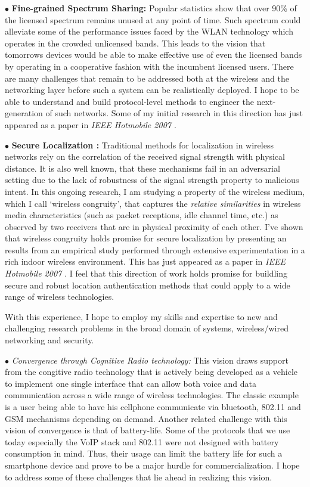 \documentclass[11pt,letterpaper]{article}
\begin{document}
$\bullet$ {\bf Fine-grained Spectrum Sharing:} Popular statistics show that over 90\% of the licensed spectrum remains
unused at any point of time.  Such spectrum could alleviate some of the performance issues faced by the WLAN technology
which operates in the crowded unlicensed bands. This leads to the vision that tomorrows devices would be able to make
effective use of even the licensed bands by operating in a cooperative fashion with the incumbent licensed users. There
are many challenges that remain to be addressed both at the wireless and the networking layer before such a system can
be realistically deployed. I hope to be able to understand and build protocol-level methods to engineer the
next-generation of such networks. Some of my initial research in this direction has just appeared as a paper in {\it
IEEE Hotmobile 2007 \cite{spark2007}}.

$\bullet$ {\bf Secure Localization :} Traditional methods for localization in wireless networks rely on the correlation of the received signal strength with
physical distance. It is also well known, that these mechanisms fail in an adversarial setting due to the lack of
robustness of the signal strength property to malicious intent. In this ongoing research, I am studying a property of the wireless
medium, which I call `wireless congruity', that captures the {\it relative similarities} in wireless media
characteristics (such as packet receptions, idle channel time, etc.) as observed by two receivers that are in physical
proximity of each other. I've shown that wireless congruity holds promise for secure localization by presenting an
results from an empirical study performed through extensive experimentation in a rich indoor wireless environment.
This has just appeared as a paper in {\it IEEE Hotmobile 2007 \cite{cong2007}}. I feel that this direction of work holds promise for
buildling secure and robust location authentication methods that could apply to a wide range of wireless technologies.

With this experience, I hope to employ my skills and expertise to new and challenging research problems in the broad
domain of systems, wireless/wired networking and security.

\iffalse
$\bullet$ {\it Convergence through Cognitive Radio technology:} This vision draws support from the congitive radio
technology that is actively being developed as a vehicle to implement one single interface that can allow both voice and
data communication across a wide range of wireless technologies. The classic example is a user being able to have his
cellphone communicate via bluetooth, 802.11 and GSM mechanisms depending on demand. Another related challenge with this
vision of convergence is that of battery-life. Some of the protocols that we use today especially the VoIP stack and
802.11 were not designed with battery consumption in mind. Thus, their usage can limit the battery life for such a
smartphone device and prove to be a major hurdle for commercialization. I hope to address some of these challenges that lie
ahead in realizing this vision.
\end{document}
